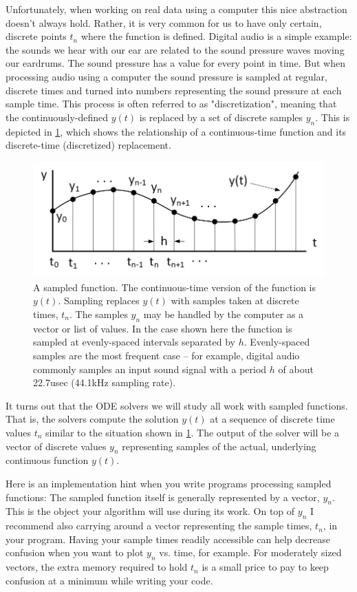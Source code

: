 \documentclass[hidelinks,notitlepage]{book}
\begin{document}
Unfortunately, when working on real data using a computer this nice abstraction doesn't always hold.  Rather, it is very common for us to have only certain, discrete points $t_n$ where the function is defined.  Digital audio is a simple example:  the sounds we hear with our ear are related to the sound pressure waves moving our eardrums.  The sound pressure has a value for every point in time.  But when processing audio using a computer the sound pressure is sampled at regular, discrete times and turned into numbers representing the sound pressure at each sample time.  This process is often referred to as "discretization", meaning that the continuously-defined $y(t)$ is replaced by a set of discrete samples $y_n$.  This is depicted in \cref{fig:SampledFcn}, which shows the relationship of a continuous-time function and its discrete-time (discretized) replacement.
\begin{figure}[tbh]
	\centering
	\includegraphics[width=0.8\columnwidth]{SampledFcn.png}
	\caption{A sampled function.  The continuous-time version of the function is $y(t)$.  Sampling replaces $y(t)$ with samples taken at discrete times, $t_n$.  The samples $y_n$ may be handled by the computer as a vector or list of values.  In the case shown here the function is sampled at evenly-spaced intervals separated by $h$.  Evenly-spaced samples are the most frequent case -- for example, digital audio commonly samples an input sound signal with a period $h$ of about 22.7usec (44.1kHz sampling rate).}
	\label{fig:SampledFcn}
\end{figure}
It turns out that the ODE solvers we will study all work with sampled functions.  That is, the solvers compute the solution $y(t)$ at a sequence of discrete time values $t_n$ similar to the situation shown in \cref{fig:SampledFcn}.  The output of the solver will be a vector of discrete values $y_n$ representing samples of the actual, underlying continuous function $y(t)$.

Here is an implementation hint when you write programs processing sampled functions:  The sampled function itself is generally represented by a vector, $y_n$.  This is the object your algorithm will use during its work.  On top of $y_n$ I recommend also carrying around a vector representing the sample times, $t_n$, in your program.  Having your sample times readily accessible can help decrease confusion when you want to plot $y_n$ vs. time, for example.  For moderately sized vectors, the extra memory required to hold $t_n$ is a small price to pay to keep confusion at a minimum while writing your code.
\end{document}
